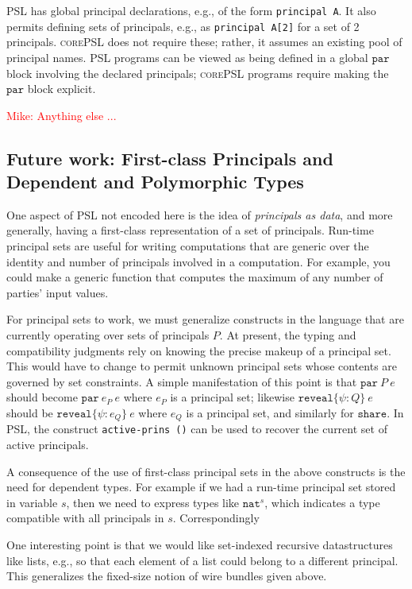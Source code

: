 \documentclass[10pt]{article}
\newcommand{\kw}[1]{\ensuremath{\mathtt{#1}}}
\newcommand{\tnat}{\ensuremath{\mathtt{nat}}}
\newcommand{\epar}[2]{\ensuremath{\kw{par}~{#1}~{#2}}}
\newcommand{\ereveal}[3]{\ensuremath{\kw{reveal}\{{#1}\!:\!{#2}\}~{#3}}}
\newcommand{\lang}{\textsc{corePSL}\xspace}
\newcommand{\mwh}[1]{\textcolor{red}{Mike: #1}}
\begin{document}
PSL has global principal declarations, e.g., of the form
\texttt{principal A}. It also permits defining sets of principals,
e.g., as \texttt{principal A[2]} for a set of 2 principals. \lang does
not require these; rather, it assumes an existing pool of principal
names. PSL programs can be viewed as being defined in a global
$\kw{par}$ block involving the declared principals; \lang programs
require making the $\kw{par}$ block explicit.

\mwh{Anything else ...}

\subsection{Future work: First-class Principals and Dependent and
  Polymorphic Types}
\label{sec:deptypes}

One aspect of PSL not encoded here is the idea of
\emph{principals as data}, and more generally, having a first-class
representation of a set of principals. Run-time principal sets are
useful for writing computations that are generic over the identity and
number of principals involved in a computation. For example, you could
make a generic function that computes the maximum of any number of
parties' input values.

For principal sets to work, we must generalize constructs in the
language that are currently operating over sets of principals $P$. At
present, the typing and compatibility judgments rely on knowing the
precise makeup of a principal set. This would have to change to permit
unknown principal sets whose contents are governed by set
constraints. A simple manifestation of this point is that
$\epar{P}{e}$ should become $\epar{e_P}{e}$ where $e_P$ is a principal
set; likewise $\ereveal{\psi}{Q}{e}$ should be $\ereveal{\psi}{e_Q}{e}$
where $e_Q$ is a principal set, and similarly for $\kw{share}$. In
PSL, the construct \texttt{active-prins ()} can be used to recover the
current set of active principals. 

A consequence of the use of first-class principal sets in the above
constructs is the need for dependent types. For example if we
had a run-time principal set stored in variable $s$, then we need to
express types like $\tnat^s$, which indicates a type compatible with
all principals in $s$. Correspondingly 

One interesting point is that we would like set-indexed recursive
datastructures like lists, e.g., so that each element of a list could
belong to a different principal. This generalizes the fixed-size
notion of wire bundles given above.
\end{document}

